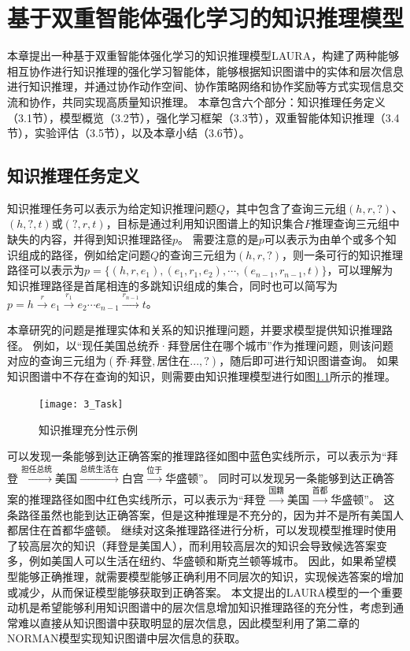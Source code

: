 \documentclass[algorithmlist, AutoFakeBold, AutoFakeSlant, figurelist, tablelist, nomlist, engineering, openany]{seuthesix} %
\begin{document}
\chapter{基于双重智能体强化学习的知识推理模型}
本章提出一种基于双重智能体强化学习的知识推理模型LAURA，构建了两种能够相互协作进行知识推理的强化学习智能体，能够根据知识图谱中的实体和层次信息进行知识推理，并通过协作动作空间、协作策略网络和协作奖励等方式实现信息交流和协作，共同实现高质量知识推理。
本章包含六个部分：知识推理任务定义（3.1节），模型概览（3.2节），强化学习框架（3.3节），双重智能体知识推理（3.4节），实验评估（3.5节），以及本章小结（3.6节）。

\section{知识推理任务定义}
知识推理任务可以表示为给定知识推理问题$Q$，其中包含了查询三元组$(h, r, ?)$、$(h, ?, t)$或$(?, r, t)$，目标是通过利用知识图谱上的知识集合$F$推理查询三元组中缺失的内容，并得到知识推理路径$p$。
需要注意的是$p$可以表示为由单个或多个知识组成的路径，例如给定问题$Q$的查询三元组为$(h, r, ?)$，则一条可行的知识推理路径可以表示为$p=\{(h, r, e_1), (e_1, r_1, e_2), \cdots, (e_{n-1}, r_{n-1}, t)\}$，可以理解为知识推理路径是首尾相连的多跳知识组成的集合，同时也可以简写为$p=h\xrightarrow{r}e_1\xrightarrow{r_1}e_2 \cdots e_{n-1}\xrightarrow{r_{n-1}}t$。

本章研究的问题是推理实体和关系的知识推理问题，并要求模型提供知识推理路径。
例如，以“现任美国总统乔·拜登居住在哪个城市”作为推理问题，则该问题对应的查询三元组为$(\mbox{乔·拜登}, \mbox{居住在...}, ?)$，随后即可进行知识图谱查询。
如果知识图谱中不存在查询的知识，则需要由知识推理模型进行如图\ref{3_Task}所示的推理。
\begin{figure}[ht]
  \centering
  \texttt{[image: 3\_Task]}
  \caption{知识推理充分性示例}
  \label{3_Task}
\end{figure}

可以发现一条能够到达正确答案的推理路径如图中蓝色实线所示，可以表示为“拜登$\xrightarrow{\mbox{担任总统}}$美国$\xrightarrow{\mbox{总统生活在}}$白宫$\xrightarrow{\mbox{位于}}$华盛顿”。
同时可以发现另一条能够到达正确答案的推理路径如图中红色实线所示，可以表示为“拜登$\xrightarrow{\mbox{国籍}}$美国$\xrightarrow{\mbox{首都}}$华盛顿”。
这条路径虽然也能到达正确答案，但是这种推理是不充分的，因为并不是所有美国人都居住在首都华盛顿。
继续对这条推理路径进行分析，可以发现模型推理时使用了较高层次的知识（拜登是美国人），而利用较高层次的知识会导致候选答案变多，例如美国人可以生活在纽约、华盛顿和斯克兰顿等城市。
因此，如果希望模型能够正确推理，就需要模型能够正确利用不同层次的知识，实现候选答案的增加或减少，从而保证模型能够获取到正确答案。
本文提出的LAURA模型的一个重要动机是希望能够利用知识图谱中的层次信息增加知识推理路径的充分性，考虑到通常难以直接从知识图谱中获取明显的层次信息，因此模型利用了第二章的NORMAN模型实现知识图谱中层次信息的获取。
\end{document}

